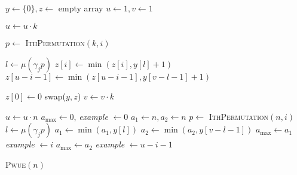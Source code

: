 \documentclass[a4paper, 10pt, ngerman]{article}
\begin{document}
\begin{algorithm}
    $y \gets \{0\}, z \gets$ empty array \;
    $u \gets 1, v \gets 1$ \;

    {
        $u \gets u \cdot k$ \;

        {
            $p \gets$ \textsc{IthPermutation}$(k, i)$ \;

             {
                $l \gets \mu(\gamma_j p)$ \;
                $z[i] \gets \min(z[i], y[l] + 1)$ \;
                $z[u - i - 1] \gets \min(z[u - i - 1], y[v - l - 1] + 1)$ \;
            }
        }

        $z[0] \gets 0$ \;
        swap($y, z$) \;
        $v \gets v \cdot k$ \;
    }
    $u \gets u \cdot n$ \;
    $a_{\max} \gets 0$, \emph{example} $\gets 0$ \;
    {
        $a_1 \gets n, a_2 \gets n$ \;
        $p \gets$ \textsc{IthPermutation}$(n, i)$ \;
        {
            $l \gets \mu(\gamma_j p)$ \;
            $a_1 \gets \min(a_1, y[l])$ \;
            $a_2 \gets \min(a_2, y[v - l - 1])$ \;
        }
        {
            $a_{\max} \gets a_1$ \;
            \emph{example} $\gets i$ \;
        }
        {
            $a_{\max} \gets a_2$ \;
            \emph{example} $\gets u - i - 1$ \;
        }
    }

     \;

    \caption{\textsc{Pwue}$(n)$}
\end{algorithm}
\end{document}
